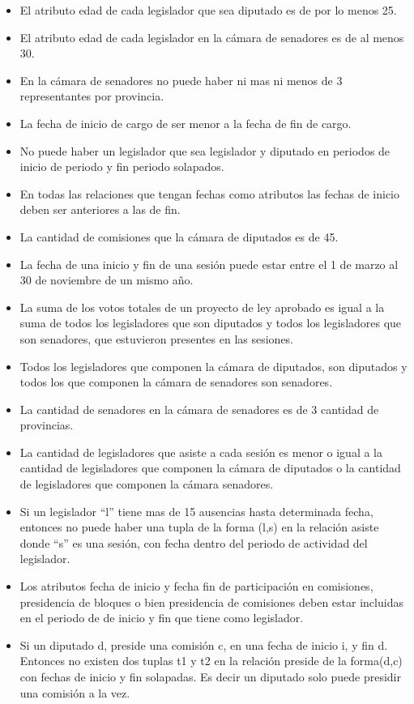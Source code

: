 \begin{itemize}
	\item El atributo edad de cada legislador que sea diputado es de por lo menos 25.
	\item El atributo edad  de cada legislador en la c\'amara de senadores es de al menos 30.
	\item En la c\'amara de senadores no puede haber ni mas ni menos de 3 representantes por provincia.
	\item La fecha de inicio de cargo de ser menor a la fecha de fin de cargo.
	\item No puede haber un legislador que sea legislador y diputado en periodos de
	 inicio de periodo y fin periodo solapados.
	
	\item En todas las relaciones que tengan fechas como atributos las fechas de inicio
	 deben ser anteriores a las de fin.
	
	\item La cantidad de comisiones que la c\'amara de diputados es de 45.
	
	\item La fecha de una inicio y fin de una sesi\'on puede estar entre el 1 de marzo al 30 de noviembre de un mismo a\~no.
	
	\item La suma de los votos totales de un proyecto de ley aprobado es igual a la suma de todos los legisladores que son diputados y todos los legisladores que son senadores, que estuvieron presentes en las sesiones.
	
	\item Todos los legisladores que componen la c\'amara de diputados, son diputados y todos los que componen la c\'amara de senadores son senadores.
	
	\item La cantidad de senadores en la c\'amara de senadores es de 3\* cantidad de provincias.
	
	\item La cantidad de legisladores que asiste a cada sesi\'on es menor o igual a la cantidad de legisladores que componen la c\'amara de diputados o la cantidad de legisladores que componen la c\'amara senadores.
	
	\item Si un legislador ``l'' tiene mas de 15 ausencias hasta determinada fecha, entonces no puede haber una tupla de la forma (l,s) en la relaci\'on asiste donde ``s'' es una sesi\'on, con fecha dentro del periodo de actividad del legislador.
	
	\item Los atributos fecha de inicio y fecha fin de participaci\'on en comisiones, presidencia de bloques o bien presidencia de comisiones deben estar incluidas en el periodo de de inicio y fin que tiene como legislador.
	
	\item Si un diputado d, preside una comisi\'on c, en una fecha de inicio i, y fin d. Entonces no existen dos tuplas t1 y t2 en la relaci\'on preside de la forma(d,c) con fechas de inicio y fin solapadas. Es decir un diputado solo puede presidir una comisi\'on a la vez.


\end{itemize}	